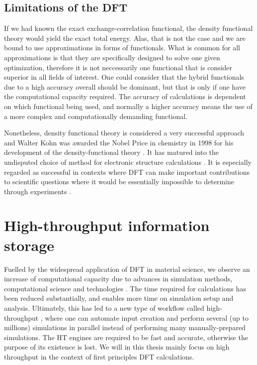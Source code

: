 \subsection{Limitations of the DFT}

If we had known the exact exchange-correlation functional, the density functional theory would yield the exact total energy. Alas, that is not the case and we are bound to use approximations in forms of functionals. What is common for all approximations is that they are specifically designed to solve one given optimization, therefore it is not neccessarily one functional that is consider superior in all fields of interest. One could consider that the hybrid functionals due to a high accuracy overall should be dominant, but that is only if one have the computational capacity required. The accuracy of calculations is dependent on which functional being used, and normally a higher accuracy means the use of a more complex and computationally demanding functional.

Nonetheless, density functional theory is considered a very successful approach and Walter Kohn was awarded the Nobel Price in chemistry in 1998 for his development of the density-functional theory \cite{Freitas1999}. It has matured into the undisputed choice of method for electronic structure calculations \cite{Schleder2019}. It is especially regarded as successful in contexts where DFT can make important contributions to scientific questions where it would be essentially impossible to determine through experiments \cite{DavidSholl2009}. %

\section{High-throughput information storage}


Fuelled by the widespread application of DFT in material science, we observe an increase of computational capacity due to advances in simulation methods, computational science and technologies \cite{Schleder2019}. The time required for calculations has been reduced substantially, and enables more time on simulation setup and analysis. Ultimately, this has led to a new type of workflow called high-throughput \cite{Yang2017}, where one can automate input creation and perform several (up to millions) simulations in parallel instead of performing many manually-prepared simulations. The HT engines are required to be fast and accurate, otherwise the purpose of its existence is lost. We will in this thesis mainly focus on high throughput in the context of first principles DFT calculations.

